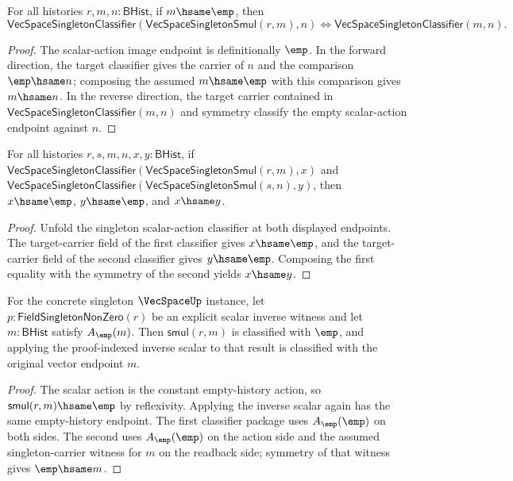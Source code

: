 \begin{theorem}
\label{thm:vecspace-singleton-smul-image-pullback}
For all histories $r,m,n:\mathsf{BHist}$, if $m\hsame\emp$, then
$$
\mathsf{VecSpaceSingletonClassifier}
  (\mathsf{VecSpaceSingletonSmul}(r,m),n)
\Longleftrightarrow
\mathsf{VecSpaceSingletonClassifier}(m,n).
$$
\end{theorem}
\begin{proof}
The scalar-action image endpoint is definitionally $\emp$. In the forward
direction, the target classifier gives the carrier of $n$ and the comparison
$\emp\hsame n$; composing the assumed $m\hsame\emp$ with this comparison gives
$m\hsame n$. In the reverse direction, the target carrier contained in
$\mathsf{VecSpaceSingletonClassifier}(m,n)$ and symmetry classify the empty
scalar-action endpoint against $n$.
\end{proof}

\begin{theorem}
\label{thm:vecspace-singleton-smul-target-deterministic}
For all histories $r,s,m,n,x,y:\mathsf{BHist}$, if
$\mathsf{VecSpaceSingletonClassifier}(\mathsf{VecSpaceSingletonSmul}(r,m),x)$
and
$\mathsf{VecSpaceSingletonClassifier}(\mathsf{VecSpaceSingletonSmul}(s,n),y)$,
then $x\hsame\emp$, $y\hsame\emp$, and $x\hsame y$.
\end{theorem}
\begin{proof}
Unfold the singleton scalar-action classifier at both displayed endpoints.
The target-carrier field of the first classifier gives $x\hsame\emp$, and the
target-carrier field of the second classifier gives $y\hsame\emp$. Composing
the first equality with the symmetry of the second yields $x\hsame y$.
\end{proof}

\begin{theorem}
\label{thm:vecspace-singleton-scalar-action-inverse-law}
For the concrete singleton $\VecSpaceUp$ instance, let
$p:\mathsf{FieldSingletonNonZero}(r)$ be an explicit scalar inverse witness and
let $m:\mathsf{BHist}$ satisfy $A_{\emp}(m)$. Then
$\mathsf{smul}(r,m)$ is classified with $\emp$, and applying the proof-indexed
inverse scalar to that result is classified with the original vector endpoint
$m$.
\end{theorem}
\begin{proof}
The scalar action is the constant empty-history action, so
$\mathsf{smul}(r,m)\hsame\emp$ by reflexivity. Applying the inverse scalar
again has the same empty-history endpoint. The first classifier package uses
$A_{\emp}(\emp)$ on both sides. The second uses $A_{\emp}(\emp)$ on the action
side and the assumed singleton-carrier witness for $m$ on the readback side;
symmetry of that witness gives $\emp\hsame m$.
\end{proof}

